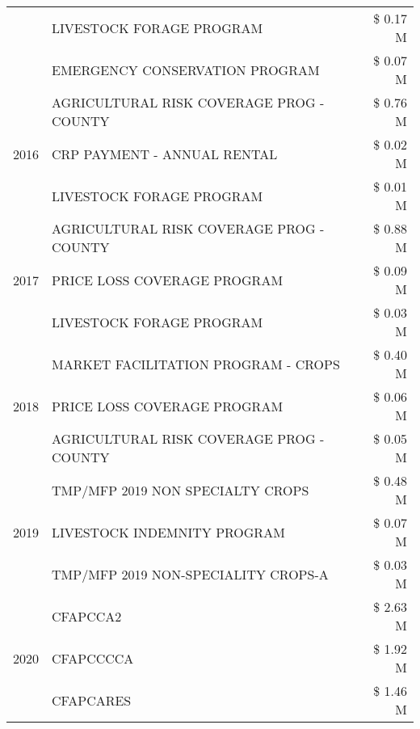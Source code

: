 \begin{tabular}{llr}
 & LIVESTOCK FORAGE PROGRAM & \$ 0.17 M \\
 & EMERGENCY CONSERVATION PROGRAM & \$ 0.07 M \\
\cline{1-3}
\multirow[t]{3}{*}{2016} & AGRICULTURAL RISK COVERAGE PROG - COUNTY & \$ 0.76 M \\
 & CRP PAYMENT - ANNUAL RENTAL & \$ 0.02 M \\
 & LIVESTOCK FORAGE PROGRAM & \$ 0.01 M \\
\cline{1-3}
\multirow[t]{3}{*}{2017} & AGRICULTURAL RISK COVERAGE PROG - COUNTY & \$ 0.88 M \\
 & PRICE LOSS COVERAGE PROGRAM & \$ 0.09 M \\
 & LIVESTOCK FORAGE PROGRAM & \$ 0.03 M \\
\cline{1-3}
\multirow[t]{3}{*}{2018} & MARKET FACILITATION PROGRAM - CROPS & \$ 0.40 M \\
 & PRICE LOSS COVERAGE PROGRAM & \$ 0.06 M \\
 & AGRICULTURAL RISK COVERAGE PROG - COUNTY & \$ 0.05 M \\
\cline{1-3}
\multirow[t]{3}{*}{2019} & TMP/MFP 2019 NON SPECIALTY CROPS & \$ 0.48 M \\
 & LIVESTOCK INDEMNITY PROGRAM & \$ 0.07 M \\
 & TMP/MFP 2019 NON-SPECIALITY CROPS-A & \$ 0.03 M \\
\cline{1-3}
\multirow[t]{3}{*}{2020} & CFAPCCA2 & \$ 2.63 M \\
 & CFAPCCCCA & \$ 1.92 M \\
 & CFAPCARES & \$ 1.46 M \\
\cline{1-3}
\bottomrule
\end{tabular}

